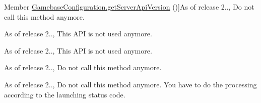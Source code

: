 \begin{DoxyRefList}
%
Member \hyperlink{classcom_1_1toast_1_1android_1_1gamebase_1_1_gamebase_configuration_af74623fc60ebad6b08ba78668d4961cc}{Gamebase\+Configuration.get\+Server\+Api\+Version} ()]As of release 2.., Do not call this method anymore.  
\item[\label{deprecated__deprecated000008}%
\Hypertarget{deprecated__deprecated000008}%
Member \hyperlink{classcom_1_1toast_1_1android_1_1gamebase_1_1_gamebase_configuration_ad3bd019dea776f3b49d1f7f3e0fe2157}{Gamebase\+Configuration.get\+Tencent\+Access\+Id} ()]As of release 2.., This A\+PI is not used anymore.  
\item[\label{deprecated__deprecated000009}%
\Hypertarget{deprecated__deprecated000009}%
Member \hyperlink{classcom_1_1toast_1_1android_1_1gamebase_1_1_gamebase_configuration_ac3f77aa86c99c8d53555859211a9f76d}{Gamebase\+Configuration.get\+Tencent\+Access\+Key} ()]As of release 2.., This A\+PI is not used anymore.  
\item[\label{deprecated__deprecated000006}%
\Hypertarget{deprecated__deprecated000006}%
Member \hyperlink{classcom_1_1toast_1_1android_1_1gamebase_1_1_gamebase_configuration_ae87f638a781db3f92a0bbe89bd3a611f}{Gamebase\+Configuration.get\+Zone\+Type} ()]As of release 2.., Do not call this method anymore.  
\item[\label{deprecated__deprecated000016}%
\Hypertarget{deprecated__deprecated000016}%
Member \hyperlink{classcom_1_1toast_1_1android_1_1gamebase_1_1launching_1_1data_1_1_launching_status_a4e7246a0ecb5d31951a58d042ad07cb7}{Launching\+Status.is\+Playable} ()]As of release 2.., Do not call this method anymore. You have to do the processing according to the launching status code. 
\end{DoxyRefList}
